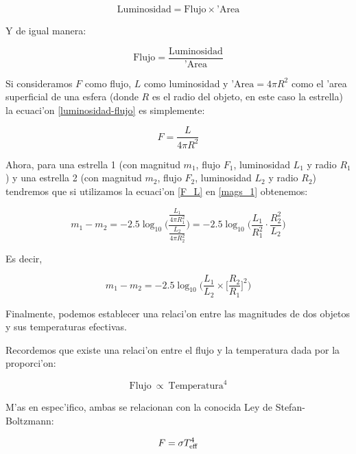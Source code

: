 \documentclass{article}
\begin{document}
\begin{enumerate}[a)]
\begin{equation} \label{flujo-luminosidad}
\text{Luminosidad} = \text{Flujo} \times \text{'Area}
\end{equation}

Y de igual manera:

\begin{equation} \label{luminosidad-flujo}
\text{Flujo} = \frac{\text{Luminosidad}}{\text{'Area}}
\end{equation}

Si consideramos $F$ como flujo, $L$ como luminosidad y $\text{'Area} = 4 \pi R^2$ como el 'area superficial de una esfera (donde $R$ es el radio del objeto, en este caso la estrella) la ecuaci'on \eqref{luminosidad-flujo} es simplemente:

\begin{equation} \label{F_L}
F = \frac{L}{4 \pi R^2}
\end{equation}

Ahora, para una estrella 1 (con magnitud $m_1$, flujo $F_1$, luminosidad $L_1$ y radio $R_1$) y una estrella 2 (con magnitud $m_2$, flujo $F_2$, luminosidad $L_2$ y radio $R_2$) tendremos que si utilizamos la ecuaci'on \eqref{F_L} en \eqref{mags_1} obtenemos:

\begin{equation*}
m_1 - m_2 = -2.5 \log_{10} \bigg(\frac{\frac{L_1}{4 \pi R_1^2}}{\frac{L_2}{4 \pi R_2^2}} \bigg) = -2.5 \log_{10} \bigg(\frac{L_1}{R_1^2} \cdot \frac{R_2^2}{L_2} \bigg)
\end{equation*}

Es decir,

\begin{equation} \label{luminosidad_magnitud}
m_1 - m_2 = -2.5 \log_{10} \bigg( \frac{L_1}{L_2} \times \bigg[\frac{R_2}{R_1} \bigg]^2 \bigg)
\end{equation}

Finalmente, podemos establecer una relaci'on entre las magnitudes de dos objetos y sus temperaturas efectivas.

Recordemos que existe una relaci'on entre el flujo y la temperatura dada por la proporci'on:

\begin{equation}
\text{Flujo} \ \propto \ \text{Temperatura}^4
\end{equation}

M'as en espec'ifico, ambas se relacionan con la conocida Ley de Stefan-Boltzmann:

\begin{equation} \label{stefan-boltzmann}
F = \sigma T_{\rm eff}^4
\end{equation}


\end{enumerate}
\end{document}
